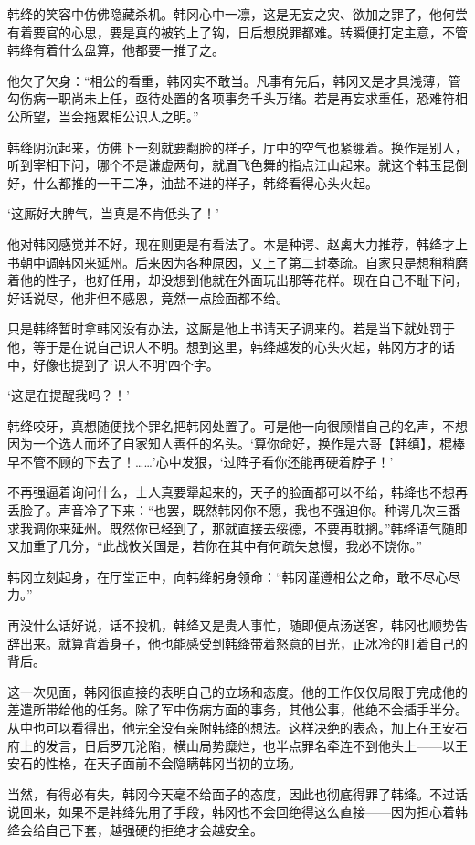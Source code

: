 韩绛的笑容中仿佛隐藏杀机。韩冈心中一凛，这是无妄之灾、欲加之罪了，他何尝有着要官的心思，要是真的被钓上了钩，日后想脱罪都难。转瞬便打定主意，不管韩绛有着什么盘算，他都要一推了之。

他欠了欠身：“相公的看重，韩冈实不敢当。凡事有先后，韩冈又是才具浅薄，管勾伤病一职尚未上任，亟待处置的各项事务千头万绪。若是再妄求重任，恐难符相公所望，当会拖累相公识人之明。”

韩绛阴沉起来，仿佛下一刻就要翻脸的样子，厅中的空气也紧绷着。换作是别人，听到宰相下问，哪个不是谦虚两句，就眉飞色舞的指点江山起来。就这个韩玉昆倒好，什么都推的一干二净，油盐不进的样子，韩绛看得心头火起。

‘这厮好大脾气，当真是不肯低头了！’

他对韩冈感觉并不好，现在则更是有看法了。本是种谔、赵禼大力推荐，韩绛才上书朝中调韩冈来延州。后来因为各种原因，又上了第二封奏疏。自家只是想稍稍磨着他的性子，也好任用，却没想到他就在外面玩出那等花样。现在自己不耻下问，好话说尽，他非但不感恩，竟然一点脸面都不给。

只是韩绛暂时拿韩冈没有办法，这厮是他上书请天子调来的。若是当下就处罚于他，等于是在说自己识人不明。想到这里，韩绛越发的心头火起，韩冈方才的话中，好像也提到了‘识人不明’四个字。

‘这是在提醒我吗？！’

韩绛咬牙，真想随便找个罪名把韩冈处置了。可是他一向很顾惜自己的名声，不想因为一个选人而坏了自家知人善任的名头。‘算你命好，换作是六哥【韩缜】，棍棒早不管不顾的下去了！……’心中发狠，‘过阵子看你还能再硬着脖子！’

不再强逼着询问什么，士人真要犟起来的，天子的脸面都可以不给，韩绛也不想再丢脸了。声音冷了下来：“也罢，既然韩冈你不愿，我也不强迫你。种谔几次三番求我调你来延州。既然你已经到了，那就直接去绥德，不要再耽搁。”韩绛语气随即又加重了几分，“此战攸关国是，若你在其中有何疏失怠慢，我必不饶你。”

韩冈立刻起身，在厅堂正中，向韩绛躬身领命：“韩冈谨遵相公之命，敢不尽心尽力。”

再没什么话好说，话不投机，韩绛又是贵人事忙，随即便点汤送客，韩冈也顺势告辞出来。就算背着身子，他也能感受到韩绛带着怒意的目光，正冰冷的盯着自己的背后。

这一次见面，韩冈很直接的表明自己的立场和态度。他的工作仅仅局限于完成他的差遣所带给他的任务。除了军中伤病方面的事务，其他公事，他绝不会插手半分。从中也可以看得出，他完全没有亲附韩绛的想法。这样决绝的表态，加上在王安石府上的发言，日后罗兀沦陷，横山局势糜烂，也半点罪名牵连不到他头上——以王安石的性格，在天子面前不会隐瞒韩冈当初的立场。

当然，有得必有失，韩冈今天毫不给面子的态度，因此也彻底得罪了韩绛。不过话说回来，如果不是韩绛先用了手段，韩冈也不会回绝得这么直接——因为担心着韩绛会给自己下套，越强硬的拒绝才会越安全。

